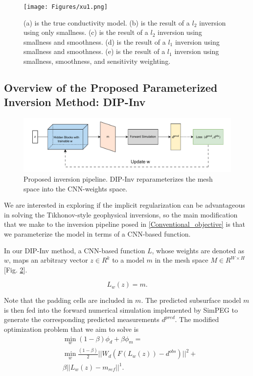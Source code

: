 \documentclass[lettersize,journal]{IEEEtran}
\begin{document}
\begin{figure}[h!]
\centering
\texttt{[image: Figures/xu1.png]}
\caption{(a) is the true conductivity model. (b) is the result of a $l_2$ inversion using only smallness. (c) is the result of a $l_2$ inversion using smallness and smoothness. (d) is the result of a $l_1$ inversion using smallness and smoothness. (e) is the result of a $l_1$ inversion using smallness, smoothness, and sensitivity weighting.}
\label{fig2.5}
\end{figure}

\subsection{Overview of the Proposed Parameterized Inversion Method: DIP-Inv}

\begin{figure}[t]
\centering
\includegraphics[width=4.7in]{Figures/xu2.pdf}
\caption{Proposed inversion pipeline. DIP-Inv reparameterizes the mesh space into the CNN-weights space.}
\label{fig2_1}
\end{figure}

We are interested in exploring if the implicit regularization can be advantageous in solving the Tikhonov-style geophysical inversions, so the main modification that we make to the inversion pipeline posed in \ref{Conventional_objective} is that we parameterize the model in terms of a CNN-based function. 

In our DIP-Inv method, a CNN-based function $L$, whose weights are denoted as $w$, maps an arbitrary vector $z \in R^k$ to a model $m$ in the mesh space $M \in R^{W\times H}$ [Fig. \ref{fig2_1}].

\begin{equation}
\label{Define L}
L_w(z) = m.
\end{equation}

Note that the padding cells are included in $m$. The predicted subsurface model $m$ is then fed into the forward numerical simulation implemented by SimPEG to generate the corresponding predicted measurements $d^{pred}$. The modified optimization problem that we aim to solve is 
\begin{equation}
\label{Proposed_objective}
\begin{aligned}
&\min_w (1-\beta) \phi_d + \beta \phi_m =\\&\min_w \frac{(1-\beta)}{2}||W_d(F(L_w(z)) - d^{obs})||^2 + \\&\beta ||L_w(z)-m_{ref}||^1. 
\end{aligned}
\end{equation}
 
\end{document}
